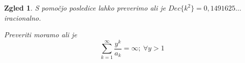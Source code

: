 \documentclass{beamer}
\newtheorem{zgled}{Zgled}
\begin{document}
\begin{frame}
    \begin{zgled}
        S pomočjo posledice lahko preverimo ali je $Dec\{k^2\} = 0,1491625\dots$ iracionalno.
        \pause
        
        Preveriti moramo ali je \[\sum_{k=1}^{\infty}\frac{y^k}{a_k} = \infty; \ \forall y > 1\]
    \end{zgled}


\end{frame}
\end{document}

